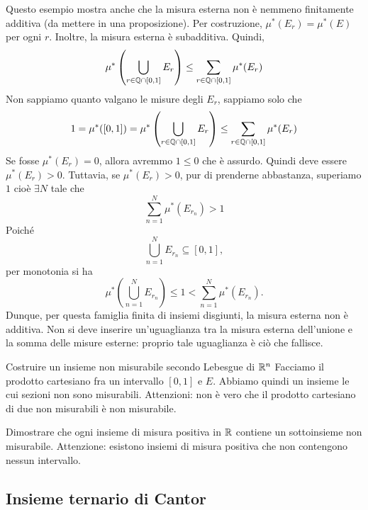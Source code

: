 \documentclass[a4paper]{article}
\begin{document}
\begin{radioactive}
Questo esempio mostra anche che la misura esterna non è nemmeno finitamente additiva
(da mettere in una proposizione).
Per costruzione, \(\mu^*(E_r) = \mu^*(E)\) per ogni \(r\).
Inoltre, la misura esterna è subadditiva. Quindi, \[
    \mu^*\left(
        \bigcup_{r \in \mathbb{Q}\cap[0,1]}
        E_r
    \right) \leq
    \sum_{r \in \mathbb{Q}\cap[0,1]} \mu^*(E_r)
\]
Non sappiamo quanto valgano le misure degli \(E_r\), sappiamo solo che
\[
    1 = \mu^*([0,1]) = \mu^*\left(
        \bigcup_{r \in \mathbb{Q}\cap[0,1]}
        E_r
    \right) \leq \sum_{r \in \mathbb{Q}\cap[0,1]} \mu^*(E_r)
\]
Se fosse \(\mu^*(E_r) = 0\), allora avremmo \(1 \leq 0\)
che è assurdo. Quindi deve essere \(\mu^*(E_r) > 0\).
Tuttavia, se \(\mu^*(E_r) > 0\), pur di prenderne abbastanza,
superiamo \(1\) cioè \(\exists N\) tale che \[
    \sum_{n=1}^N \mu^*(E_{r_n})>1
\]
Poiché
\[
    \bigcup_{n=1}^N E_{r_n}\subseteq[0,1],
\]
per monotonia si ha
\[
    \mu^*\left(\bigcup_{n=1}^N E_{r_n}\right)\leq1
    <\sum_{n=1}^N\mu^*(E_{r_n}).
\]
Dunque, per questa famiglia finita di insiemi disgiunti, la misura esterna non è
additiva. Non si deve inserire un'uguaglianza tra la misura esterna dell'unione e la
somma delle misure esterne: proprio tale uguaglianza è ciò che fallisce.
\end{radioactive}

\begin{radioactive}
\begin{snippetexercise}{Costruire un insieme non misurabile secondo Lebesgue di \(\mathbb{R}^n\)}
    Facciamo il prodotto cartesiano fra un intervallo \([0,1]\) e \(E\).
    Abbiamo quindi un insieme le cui sezioni non sono misurabili.
    Attenzioni: non è vero che il prodotto cartesiano di due non misurabili
    è non misurabile.
\end{snippetexercise}
\end{radioactive}

\begin{radioactive}
\begin{snippetexercise}{}
    Dimostrare che ogni insieme di misura positiva in \(\mathbb{R}\)
    contiene un sottoinsieme non misurabile.
    Attenzione: esistono insiemi di misura positiva che non contengono nessun intervallo.
\end{snippetexercise}
\end{radioactive}

\subsection{Insieme ternario di Cantor}
\end{document}
